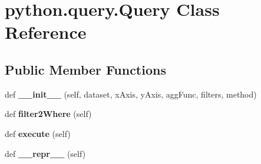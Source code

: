 \hypertarget{classpython_1_1query_1_1_query}{}\section{python.\+query.\+Query Class Reference}
\label{classpython_1_1query_1_1_query}
\subsection*{Public Member Functions}
\begin{DoxyCompactItemize}
\item 
\mbox{\label{classpython_1_1query_1_1_query_a4ea68402931fea959744ae04d179bcd6}} 
def {\bfseries \+\_\+\+\_\+init\+\_\+\+\_\+} (self, dataset, x\+Axis, y\+Axis, agg\+Func, filters, method)
\item 
\mbox{\label{classpython_1_1query_1_1_query_ae869e857a434881c9c7d09b58cf8b4c5}} 
def {\bfseries filter2\+Where} (self)
\item 
\mbox{\label{classpython_1_1query_1_1_query_a0f1956093b6ab71faa46cd6832b1f254}} 
def {\bfseries execute} (self)
\item 
\mbox{\label{classpython_1_1query_1_1_query_ab44e41729de305ae7cbe7d57b376824f}} 
def {\bfseries \+\_\+\+\_\+repr\+\_\+\+\_\+} (self)
\end{DoxyCompactItemize}
